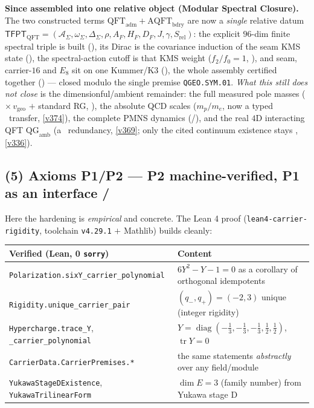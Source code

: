 \documentclass[11pt,a4paper]{article}
\theoremstyle{definition}
\renewcommand{\arraystretch}{1.15}
\begin{document}
\par\smallskip\noindent\textbf{Since assembled into one relative object (Modular Spectral Closure).} The two
constructed terms $\mathrm{QFT}_{\mathrm{adm}}+\mathrm{AQFT}_{\mathrm{bdry}}$ are now a \emph{single} relative
datum $\mathsf{TFPT}_{\mathrm{QFT}}=(\mathcal A_\Sigma,\omega_\Sigma,\Delta_\Sigma,\rho,A_F,H_F,D_F,J,\gamma,
S_{\mathrm{rel}})$: the explicit $96$-dim finite spectral triple is built (),
its Dirac is the covariance induction of the seam KMS state (), the
spectral-action cutoff is that KMS weight ($f_2/f_0{=}1$, ), and seam,
carrier-$16$ and $E_8$ sit on one Kummer/K3 (), the whole assembly
certified together () --- closed modulo the single premise
\texttt{QGEO.SYM.01}. \emph{What this still does \emph{not} close} is the dimensionful/ambient remainder: the
full measured pole masses ($\times\,v_{\mathrm{geo}}$ $+$ standard RG, \mC), the absolute QCD scales
($m_p/m_e$, now a typed \mC\ transfer, \vref{v374}), the complete PMNS dynamics (\mC/\mO), and the real $4$D
interacting QFT $\mathrm{QG}_{\mathrm{amb}}$ (a \mC\ redundancy, \vref{v369}; only the cited continuum existence
stays \mO, \vref{v336}).

\subsection*{(5) Axioms P1/P2 --- P2 machine-verified, P1 as an interface \mE/\mO}
Here the hardening is \emph{empirical} and concrete. The Lean 4 proof (\texttt{lean4-carrier-rigidity},
toolchain \texttt{v4.29.1} $+$ Mathlib) builds cleanly:
\begin{center}\small
\renewcommand{\arraystretch}{1.15}
\begin{tabularx}{\linewidth}{@{}lY@{}}
\toprule
\textbf{Verified (Lean, 0 \texttt{sorry})} & \textbf{Content} \\
\midrule
\texttt{Polarization.sixY\_carrier\_polynomial} & $6Y^2-Y-1=0$ as a corollary of orthogonal idempotents \\
\texttt{Rigidity.unique\_carrier\_pair} & $(q_-,q_+)=(-2,3)$ unique (integer rigidity) \\
\texttt{Hypercharge.trace\_Y}, \texttt{\_carrier\_polynomial} & $Y=\operatorname{diag}(-\tfrac13,-\tfrac13,-\tfrac13,\tfrac12,\tfrac12)$, $\operatorname{tr}Y=0$ \\
\texttt{CarrierData.CarrierPremises.*} & the same statements \emph{abstractly} over any field/module \\
\texttt{YukawaStageDExistence}, \texttt{YukawaTrilinearForm} & $\dim E=3$ (family number) from Yukawa stage D \\
\bottomrule
\end{tabularx}
\end{center}
\end{document}
